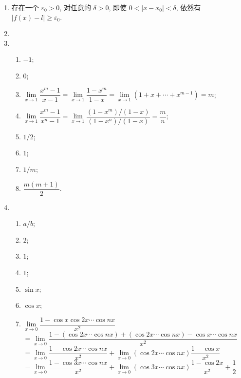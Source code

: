 \begin{enumerate}
    \item %
        存在一个 $\varepsilon_0 > 0$, 对任意的 $\delta > 0$, 即使 $0 < |x - x_0| < \delta$, 依然有 $|f(x) - l| \geqslant \varepsilon_0$.
    \item %
    \item %
        \begin{enumerate}[(1)]
            \item %
                $-1$;
            \item %
                $0$;
            \item %
                $\lim\limits_{x\to1}\dfrac{x^m-1}{x-1} = \lim\limits_{x\to1}\dfrac{1-x^m}{1-x} = \lim\limits_{x\to1}(1 + x + \cdots + x^{m-1}) = m$;
            \item %
                $\lim\limits_{x\to1}\dfrac{x^m-1}{x^n-1} = \lim\limits_{x\to1}\dfrac{(1-x^m)/(1-x)}{(1-x^n)/(1-x)} = \dfrac mn$;
            \item %
                $1/2$;
            \item %
                $1$;
            \item %
                $1/m$;
            \item %
                $\dfrac{m(m+1)}{2}$.
        \end{enumerate}
    \item %
        \begin{enumerate}[(1)]
            \item %
                $a/b$;
            \item %
                $2$;
            \item %
                $1$;
            \item %
                $1$;
            \item %
                $\sin x$;
            \item %
                $\cos x$;
            \item %
                $\lim\limits_{x\to0}\dfrac{1-\cos x\cos 2x\cdots\cos nx}{x^2}$ \\
                $= \lim\limits_{x\to0} \dfrac{1 - (\cos2x \cdots \cos nx) + (\cos2x \cdots \cos nx) -\cos x \cdots \cos nx}{x^2}$ \\
                $= \lim\limits_{x\to0} \dfrac{1 - \cos2x \cdots \cos nx}{x^2} + \lim\limits_{x\to0} (\cos2x \cdots \cos nx) \dfrac{1 - \cos x}{x^2}$ \\
                $= \lim\limits_{x\to0} \dfrac{1 - \cos3x \cdots \cos nx}{x^2} + \lim\limits_{x\to0} (\cos3x \cdots \cos nx) \dfrac{1 - \cos2x}{x^2} + \dfrac12$ \\

\end{enumerate}
\end{enumerate}
